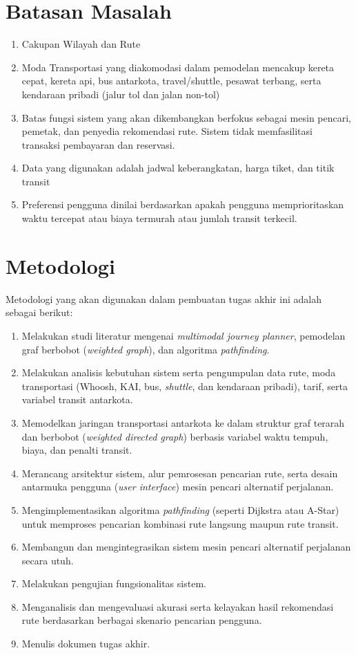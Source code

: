 \section{Batasan Masalah}
\label{sec:batasan}
\begin{enumerate}
	    \item Cakupan Wilayah dan Rute %
        \item Moda Transportasi yang diakomodasi dalam pemodelan mencakup kereta cepat, kereta api, bus antarkota, travel/shuttle, pesawat terbang, serta kendaraan pribadi (jalur tol dan jalan non-tol)
        \item Batas fungsi sistem yang akan dikembangkan berfokus sebagai mesin pencari, pemetak, dan penyedia rekomendasi rute. Sistem tidak memfasilitasi transaksi pembayaran dan reservasi.
        \item Data yang digunakan adalah jadwal keberangkatan, harga tiket, dan titik transit %
        \item Preferensi pengguna dinilai berdasarkan apakah pengguna memprioritaskan waktu tercepat atau biaya termurah atau jumlah transit terkecil.
	\end{enumerate}

\section{Metodologi}
\label{sec:metlit}
Metodologi yang akan digunakan dalam pembuatan tugas akhir ini adalah sebagai berikut:
	\begin{enumerate}
	   \item Melakukan studi literatur mengenai \textit{multimodal journey planner}, pemodelan graf berbobot (\textit{weighted graph}), dan algoritma \textit{pathfinding}.
	   \item Melakukan analisis kebutuhan sistem serta pengumpulan data rute, moda transportasi (Whoosh, KAI, bus, \textit{shuttle}, dan kendaraan pribadi), tarif, serta variabel transit antarkota.
	   \item Memodelkan jaringan transportasi antarkota ke dalam struktur graf terarah dan berbobot (\textit{weighted directed graph}) berbasis variabel waktu tempuh, biaya, dan penalti transit.
	   \item Merancang arsitektur sistem, alur pemrosesan pencarian rute, serta desain antarmuka pengguna (\textit{user interface}) mesin pencari alternatif perjalanan.
	   \item Mengimplementasikan algoritma \textit{pathfinding} (seperti Dijkstra atau A-Star) untuk memproses pencarian kombinasi rute langsung maupun rute transit.
	   \item Membangun dan mengintegrasikan sistem mesin pencari alternatif perjalanan secara utuh.
	   \item Melakukan pengujian fungsionalitas sistem.
	   \item Menganalisis dan mengevaluasi akurasi serta kelayakan hasil rekomendasi rute berdasarkan berbagai skenario pencarian pengguna.
	   \item Menulis dokumen tugas akhir.
\end{enumerate}

